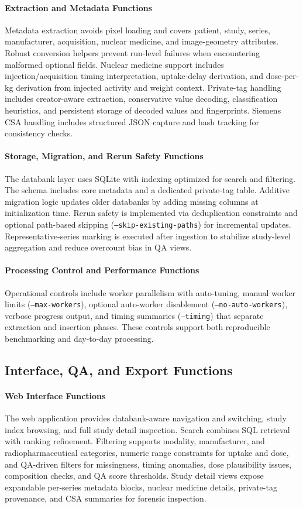 \paragraph{Extraction and Metadata Functions}
Metadata extraction avoids pixel loading and covers patient, study, series, manufacturer, acquisition, nuclear medicine, and image-geometry attributes. Robust conversion helpers prevent run-level failures when encountering malformed optional fields. Nuclear medicine support includes injection/acquisition timing interpretation, uptake-delay derivation, and dose-per-kg derivation from injected activity and weight context. Private-tag handling includes creator-aware extraction, conservative value decoding, classification heuristics, and persistent storage of decoded values and fingerprints. Siemens CSA handling includes structured JSON capture and hash tracking for consistency checks.

\paragraph{Storage, Migration, and Rerun Safety Functions}
The databank layer uses SQLite with indexing optimized for search and filtering. The schema includes core metadata and a dedicated private-tag table. Additive migration logic updates older databanks by adding missing columns at initialization time. Rerun safety is implemented via deduplication constraints and optional path-based skipping (\texttt{--skip-existing-paths}) for incremental updates. Representative-series marking is executed after ingestion to stabilize study-level aggregation and reduce overcount bias in QA views.

\paragraph{Processing Control and Performance Functions}
Operational controls include worker parallelism with auto-tuning, manual worker limits (\texttt{--max-workers}), optional auto-worker disablement (\texttt{--no-auto-workers}), verbose progress output, and timing summaries (\texttt{--timing}) that separate extraction and insertion phases. These controls support both reproducible benchmarking and day-to-day processing.

\subsection{Interface, QA, and Export Functions}
\paragraph{Web Interface Functions}
The web application provides databank-aware navigation and switching, study index browsing, and full study detail inspection. Search combines SQL retrieval with ranking refinement. Filtering supports modality, manufacturer, and radiopharmaceutical categories, numeric range constraints for uptake and dose, and QA-driven filters for missingness, timing anomalies, dose plausibility issues, composition checks, and QA score thresholds. Study detail views expose expandable per-series metadata blocks, nuclear medicine details, private-tag provenance, and CSA summaries for forensic inspection.

